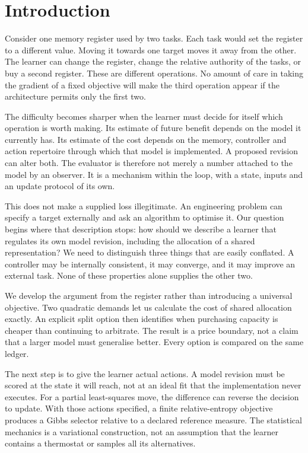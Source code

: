 \section{Introduction}
\label{sec:yba-introduction}

Consider one memory register used by two tasks. Each task would set the register to a different value. Moving it towards one target moves it away from the other. The learner can change the register, change the relative authority of the tasks, or buy a second register. These are different operations. No amount of care in taking the gradient of a fixed objective will make the third operation appear if the architecture permits only the first two.

The difficulty becomes sharper when the learner must decide for itself which operation is worth making. Its estimate of future benefit depends on the model it currently has. Its estimate of the cost depends on the memory, controller and action repertoire through which that model is implemented. A proposed revision can alter both. The evaluator is therefore not merely a number attached to the model by an observer. It is a mechanism within the loop, with a state, inputs and an update protocol of its own.

This does not make a supplied loss illegitimate. An engineering problem can specify a target externally and ask an algorithm to optimise it. Our question begins where that description stops: how should we describe a learner that regulates its own model revision, including the allocation of a shared representation? We need to distinguish three things that are easily conflated. A controller may be internally consistent, it may converge, and it may improve an external task. None of these properties alone supplies the other two.

We develop the argument from the register rather than introducing a universal objective. Two quadratic demands let us calculate the cost of shared allocation exactly. An explicit split option then identifies when purchasing capacity is cheaper than continuing to arbitrate. The result is a price boundary, not a claim that a larger model must generalise better. Every option is compared on the same ledger.

The next step is to give the learner actual actions. A model revision must be scored at the state it will reach, not at an ideal fit that the implementation never executes. For a partial least-squares move, the difference can reverse the decision to update. With those actions specified, a finite relative-entropy objective produces a Gibbs selector relative to a declared reference measure. The statistical mechanics is a variational construction, not an assumption that the learner contains a thermostat or samples all its alternatives.

